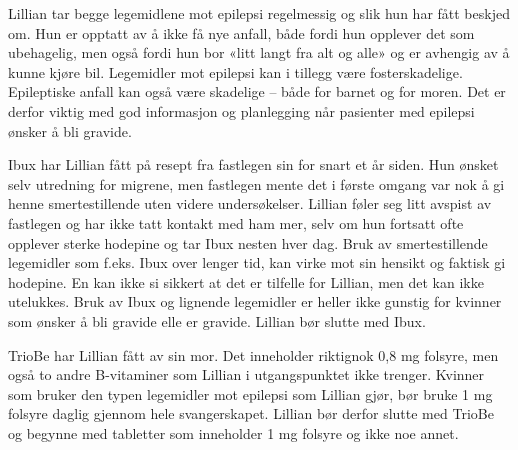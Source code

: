 Lillian tar begge legemidlene mot epilepsi regelmessig og slik hun har fått beskjed om. Hun er opptatt av å ikke få nye anfall, både fordi hun opplever det som ubehagelig, men også fordi hun bor «litt langt fra alt og alle» og er avhengig av å kunne kjøre bil. Legemidler mot epilepsi kan i tillegg være fosterskadelige. Epileptiske anfall kan også være skadelige – både for barnet og for moren. Det er derfor viktig med god informasjon og planlegging når pasienter med epilepsi ønsker å bli gravide. 

Ibux har Lillian fått på resept fra fastlegen sin for snart et år siden. Hun ønsket selv utredning for migrene, men fastlegen mente det i første omgang var nok å gi henne smertestillende uten videre undersøkelser. Lillian føler seg litt avspist av fastlegen og har ikke tatt kontakt med ham mer, selv om hun fortsatt ofte opplever sterke hodepine og tar Ibux nesten hver dag. Bruk av smertestillende legemidler som f.eks. Ibux over lenger tid, kan virke mot sin hensikt og faktisk gi hodepine. En kan ikke si sikkert at det er tilfelle for Lillian, men det kan ikke utelukkes. Bruk av Ibux og lignende legemidler er heller ikke gunstig for kvinner som ønsker å bli gravide elle er gravide. Lillian bør slutte med Ibux. 

TrioBe har Lillian fått av sin mor. Det inneholder riktignok 0,8 mg folsyre, men også to andre B-vitaminer som Lillian i utgangspunktet ikke trenger. Kvinner som bruker den typen legemidler mot epilepsi som Lillian gjør, bør bruke 1 mg folsyre daglig gjennom hele svangerskapet. Lillian bør derfor slutte med TrioBe og begynne med tabletter som inneholder 1 mg folsyre og ikke noe annet.

